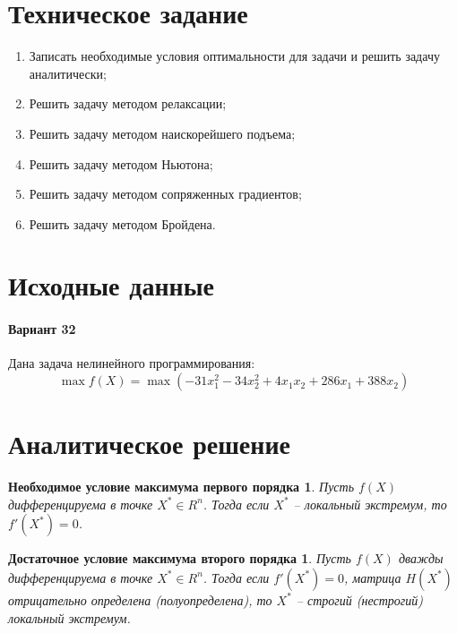 





\tableofcontents
\listoffigures
\newpage

\section{Техническое задание}

\begin{enumerate}
	\setlength{\itemsep}{0em}
	\item Записать необходимые условия оптимальности для задачи и решить задачу аналитически;
	\item Решить задачу методом релаксации;
	\item Решить задачу методом наискорейшего подъема;
	\item Решить задачу методом Ньютона;
	\item Решить задачу методом сопряженных градиентов;
	\item Решить задачу методом Бройдена.
\end{enumerate}

\section{Исходные данные}

\paragraph{Вариант 32}

Дана задача нелинейного программирования:
\begin{equation*}
	\max f(X) = \max \left( -31 x_1^2 - 34 x_2^2 + 4 x_1 x_2 + 286 x_1 + 388 x_2 \right)
\end{equation*}

\section{Аналитическое решение}

\newtheorem*{theorem1}{Необходимое условие максимума первого порядка}
\begin{theorem1}
Пусть $f(X)$ дифференцируема в точке $X^* \in R^n$. Тогда если $X^*$ -- локальный экстремум, то $f'(X^*) = 0$. 
\end{theorem1}

\newtheorem*{theorem2}{Достаточное условие максимума второго порядка}
\begin{theorem2}
Пусть $f(X)$ дважды дифференцируема в точке $X^* \in R^n$. Тогда если $f'(X^*) = 0$, матрица $H(X^*)$ отрицательно определена (полуопределена), то $X^*$ -- строгий (нестрогий) локальный экстремум.
\end{theorem2}

